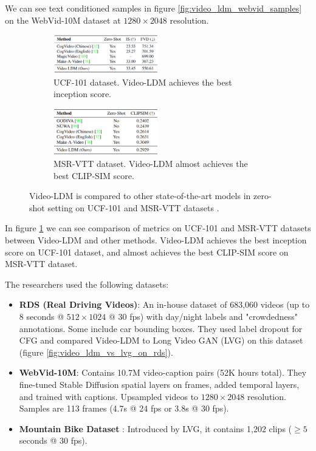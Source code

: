 We can see text conditioned samples in figure \ref{fig:video_ldm_webvid_samples} on the WebVid-10M dataset at $1280\times 2048$ resolution.

\begin{figure}
    \centering

    \begin{subfigure}{0.8\textwidth}
        \centering
        \includegraphics[width=0.5\textwidth]{images/video_ldm/ucf.png}
        \caption{UCF-101 dataset. Video-LDM achieves the best inception score.}
    \end{subfigure}

    \begin{subfigure}{0.8\textwidth}
        \centering
        \includegraphics[width=0.5\textwidth]{images/video_ldm/msr_vtt.png}
        \caption{MSR-VTT dataset. Video-LDM almost achieves the best CLIP-SIM score.}
    \end{subfigure}

    \caption{Video-LDM is compared to other state-of-the-art models in zero-shot setting on UCF-101 and MSR-VTT datasets \cite{video_ldm}.}
    \label{fig:video_ldm_ucf_msr_datasets_metrics}
\end{figure}

In figure \ref{fig:video_ldm_ucf_msr_datasets_metrics} we can see comparison of metrics on UCF-101 and MSR-VTT datasets between Video-LDM and other methods. Video-LDM achieves the best inception score on UCF-101 dataset, and almost achieves the best CLIP-SIM score on MSR-VTT dataset.

The researchers used the following datasets:

\begin{itemize}
    \item \textbf{RDS (Real Driving Videos)}: An in-house dataset of 683,060 videos (up to 8 seconds @ $512\times 1024$ @ 30 fps) with day/night labels and "crowdedness" annotations. Some include car bounding boxes. They used label dropout for CFG and compared Video-LDM to Long Video GAN (LVG) on this dataset (figure \ref{fig:video_ldm_vs_lvg_on_rds}).
    \item \textbf{WebVid-10M}: Contains 10.7M video-caption pairs (52K hours total). They fine-tuned Stable Diffusion spatial layers on frames, added temporal layers, and trained with captions. Upsampled videos to $1280\times 2048$ resolution. Samples are 113 frames (4.7s @ 24 fps or 3.8s @ 30 fps).
    \item \textbf{Mountain Bike Dataset} \cite{brooks2022generating}: Introduced by LVG, it contains 1,202 clips ($\geq 5$ seconds @ 30 fps).
\end{itemize}


